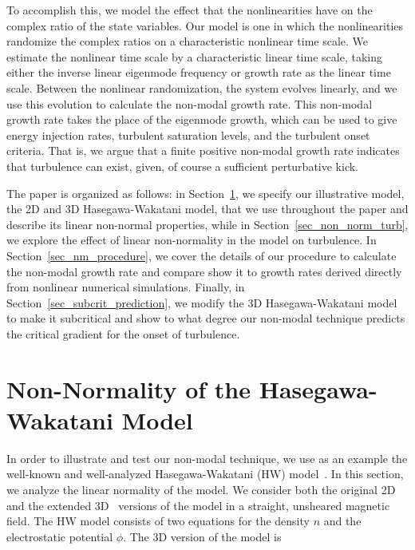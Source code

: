 \documentclass[twocolumn,showkeys,superscriptaddress]{revtex4}
\begin{document}
To accomplish this, we model the effect that the nonlinearities have on the complex ratio of the state variables. Our model is one in which the 
nonlinearities randomize the complex ratios on a characteristic nonlinear time scale.
We estimate the nonlinear time scale by a characteristic linear time scale, taking either the inverse linear eigenmode frequency or growth rate as the linear time scale.
Between the nonlinear randomization, the system evolves linearly, and we use this evolution to calculate the non-modal growth rate. This non-modal growth rate takes the place of the eigenmode growth, which can be used
to give energy injection rates, turbulent saturation levels, and the turbulent onset criteria.
That is, we argue that a finite positive non-modal growth rate indicates that turbulence can exist, given, of course a sufficient perturbative kick.

The paper is organized as follows: in Section~\ref{sec_hw_model}, we specify our illustrative model, the 2D and 3D Hasegawa-Wakatani model,
that we use throughout the paper and describe its linear non-normal properties,  while in Section~\ref{sec_non_norm_turb}, we explore the effect of linear non-normality in the model on turbulence. 
In Section~\ref{sec_nm_procedure}, we cover the details of our procedure to calculate the non-modal growth rate and compare show it to growth rates derived directly from nonlinear numerical simulations. 
Finally, in Section~\ref{sec_subcrit_prediction}, we modify the 3D Hasegawa-Wakatani model to make it subcritical and show to what degree our non-modal technique predicts the critical gradient for the onset of turbulence.

\section{Non-Normality of the Hasegawa-Wakatani Model} 
\label{sec_hw_model}

In order to illustrate and test our non-modal technique, we use as an example the well-known and well-analyzed Hasegawa-Wakatani (HW) model~\cite{hasegawa1983}.
In this section, we analyze the linear normality of the model.
We consider both the original 2D and the extended 3D~\cite{biskamp1995} versions of the model in a straight, unsheared magnetic field. 
The HW model consists of two equations for the density $n$ and the electrostatic potential $\phi$. The 3D version of the model is
\end{document}
